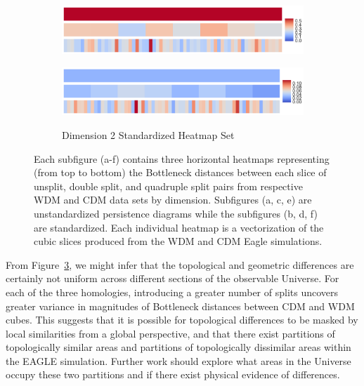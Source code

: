 \documentclass[12pt]{article}
\newcommand{\figref}[1]{Figure~\ref{#1}}
\begin{document}
\begin{figure}[htp!]
\begin{subfigure}{.45\textwidth}
    \includegraphics[width=\linewidth]{fig_12_hmap_dim2_nonorm.pdf}
    \label{fig:cubeHeatmap2}
  \end{subfigure}
  \begin{subfigure}{.45\textwidth}
    \centering
    \caption{Dimension 2 Standardized Heatmap Set}
    \includegraphics[width=\linewidth]{fig_12_hmap_dim2_yesnorm.pdf}
    \label{fig:cubeHeatmapStand2}
  \end{subfigure}
  \caption{Each subfigure (a-f) contains three horizontal heatmaps representing (from top to bottom) the Bottleneck distances between each slice of unsplit, double split, and quadruple split pairs from respective WDM and CDM data sets by dimension. Subfigures (a, c, e) are unstandardized persistence diagrams while the subfigures (b, d, f) are standardized. Each individual heatmap is a vectorization of the cubic slices produced from the WDM and CDM Eagle simulations.}
  \label{fig:cubeHeatmap}
\end{figure}

From \figref{fig:cubeHeatmap}, we might infer that the topological and geometric differences are certainly not uniform across different sections of the observable Universe. For each of the three homologies, introducing a greater number of splits uncovers greater variance in magnitudes of Bottleneck distances between CDM and WDM cubes. This suggests that it is possible for topological differences to be masked by local similarities from a global perspective, and that there exist partitions of topologically similar areas and partitions of topologically dissimilar areas within the EAGLE simulation. Further work should explore what areas in the Universe occupy these two partitions and if there exist physical evidence of differences.
\end{document}
